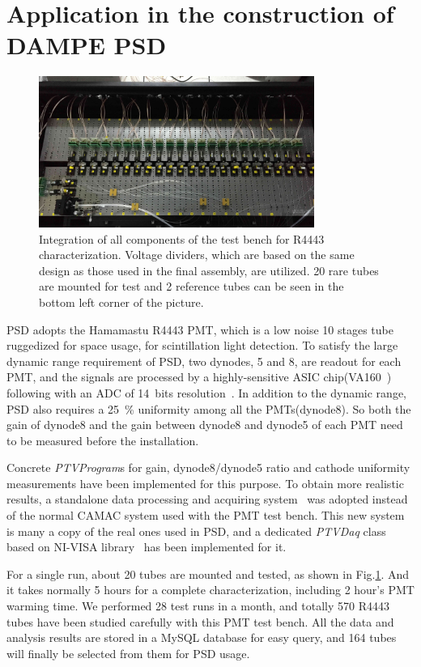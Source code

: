 \documentclass[review, times]{elsarticle}
\begin{document}
\section{Application in the construction of DAMPE PSD}
\label{sec:application}

\begin{figure}
 \centering
 \includegraphics[width=90mm]{integration3}
\caption{Integration of all components of the test bench for R4443 characterization.
Voltage dividers, which are based on the same design as those used in the final assembly, are utilized. 
20 rare tubes are mounted for test and 2 reference tubes can be seen in the bottom left corner of the picture. 
}
\label{fig:integrated_testbench}
\end{figure}

PSD adopts the Hamamastu R4443 PMT, which is a low noise 10 stages tube ruggedized for space usage, for scintillation light detection.
To satisfy the large dynamic range requirement of PSD, two dynodes, 5 and 8, are readout for each PMT, 
and the signals are processed by a highly-sensitive ASIC chip(VA160~\cite{va160}) following with an ADC of 14~bits resolution~\cite{fee}. 
In addition to the dynamic range, PSD also requires a \SI{25}{\percent} uniformity among all the PMTs(dynode8). 
So both the gain of dynode8 and the gain between dynode8 and dynode5 of each PMT need to be measured before the installation.

Concrete \textit{PTVProgram}s for gain, dynode8/dynode5 ratio and cathode uniformity measurements have been implemented for this purpose.
To obtain more realistic results, a standalone data processing and acquiring system~\cite{fee} was adopted instead of the normal CAMAC system used with the PMT test bench. 
This new system is many a copy of the real ones used in PSD, and a dedicated \textit{PTVDaq} class based on NI-VISA library~\cite{ni_visa} has been implemented for it.

For a single run, about 20 tubes are mounted and tested, as shown in Fig.\ref{fig:integrated_testbench}.
And it takes normally 5 hours for a complete characterization, including 2 hour's PMT warming time. 
We performed 28 test runs in a month, and totally 570 R4443 tubes have been studied carefully with this PMT test bench. 
All the data and analysis results are stored in a MySQL database for easy query, and 164 tubes will finally be selected from them for PSD usage.
\end{document}
